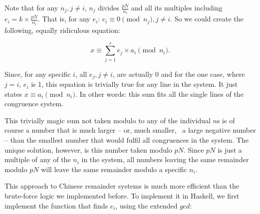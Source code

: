 \documentclass{scrreprt}
\newcommand{\Varid}[1]{\mathit{#1}}
\begin{document}
Note that for any $n_j, j \neq i$, 
$n_j$ divides $\frac{pN}{n_i}$ and all its multiples
including $e_i = k \times \frac{pN}{n_i}$.
That is, for any $e_i$: $e_i \equiv 0 \pmod{n_j}, j \neq i$.
So we could create the following, equally ridiculous equation:

\begin{equation}
x \equiv \sum_{j=1}^r{e_j \times a_i} \pmod{n_i}.
\end{equation}

Since, for any specific $i$, all $e_j, j \neq i$,
are actually 0 and for the one case, where $j = i$,
$e_i$ is 1, 
this equation is trivially true
for any line in the system. 
It just states $x \equiv a_i \pmod{n_i}$.
In other words: this sum fits all the single lines
of the congruence system.

This trivially magic sum 
not taken modulo to any of the individual $n$s
is of course a number that is much larger -- or,
much smaller, \ie\ a large negative number --
than the smallest number that would fulfil all
congruences in the system. The unique solution,
however, is this number taken modulo $pN$.
Since $pN$ is just a multiple of any of the $n_i$
in the system, all numbers leaving the same remainder
modulo $pN$ will leave the same remainder
modulo a specific $n_i$.


This approach to Chinese remainder systems
is much more efficient than the brute-force
logic we implemented before.
To implement it in Haskell, we first
implement the function that finds $e_i$,
using the extended \ensuremath{\Varid{gcd}}:
\end{document}
